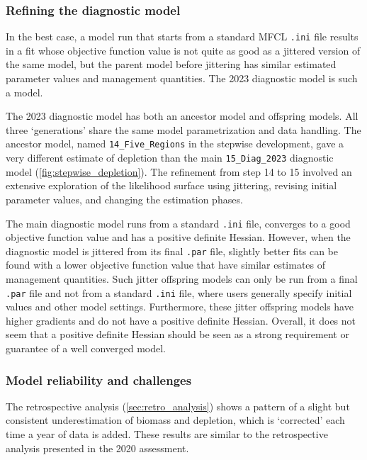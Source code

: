\subsubsection{Refining the diagnostic model}

In the best case, a model run that starts from a standard MFCL \verb|.ini| file results in a fit whose objective function value is not quite as good as a jittered version of the same model, but the parent model before jittering has similar estimated parameter values and management quantities. The 2023 diagnostic model is such a model.

The 2023 diagnostic model has both an ancestor model and offspring models. All three `generations' share the same model parametrization and data handling. The ancestor model, named \verb|14_Five_Regions| in the stepwise development, gave a very different estimate of depletion than the main \verb|15_Diag_2023| diagnostic model (\autoref{fig:stepwise_depletion}). The refinement from step 14 to 15 involved an extensive exploration of the likelihood surface using jittering, revising initial parameter values, and changing the estimation phases.

The main diagnostic model runs from a standard \verb|.ini| file, converges to a good objective function value and has a positive definite Hessian. However, when the diagnostic model is jittered from its final \verb|.par| file, slightly better fits can be found with a lower objective function value that have similar estimates of management quantities. Such jitter offspring models can only be run from a final \verb|.par| file and not from a standard \verb|.ini| file, where users generally specify initial values and other model settings. Furthermore, these jitter offspring models have higher gradients and do not have a positive definite Hessian. Overall, it does not seem that a positive definite Hessian should be seen as a strong requirement or guarantee of a well converged model.

\subsubsection{Model reliability and challenges}

The retrospective analysis (\autoref{sec:retro_analysis}) shows a pattern of a slight but consistent underestimation of biomass and depletion, which is `corrected' each time a year of data is added. These results are similar to the retrospective analysis presented in the 2020 assessment.

